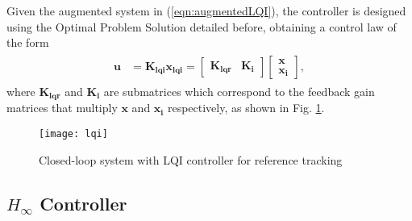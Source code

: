 Given the augmented system in (\ref{eqn:augmentedLQI}), the controller is designed using the Optimal Problem Solution detailed before, obtaining a control law of the form
\begin{align}
\begin{split}
\mathbf{u} & = \mathbf{K_{lqi}}\mathbf{x_{lqi}} =\begin{bmatrix}
\mathbf{K_{lqr}} & \mathbf{K_{i}}
\end{bmatrix}\begin{bmatrix}
\mathbf{x} \\
\mathbf{x_i}
\end{bmatrix},
\end{split}
\end{align}
where $\mathbf{K_{lqr}}$ and $\mathbf{K_i}$ are  submatrices which correspond to the feedback gain matrices that multiply $\mathbf{x}$ and $\mathbf{x_i}$ respectively, as shown in Fig. \ref{fig:lqi}.
	\begin{figure}[h]
	\begin{center}
	\texttt{[image: lqi]}
	\caption{Closed-loop system with LQI controller for reference tracking}
	\label{fig:lqi}
	\end{center}
	\end{figure}


\subsection{$H_\infty$ Controller}
